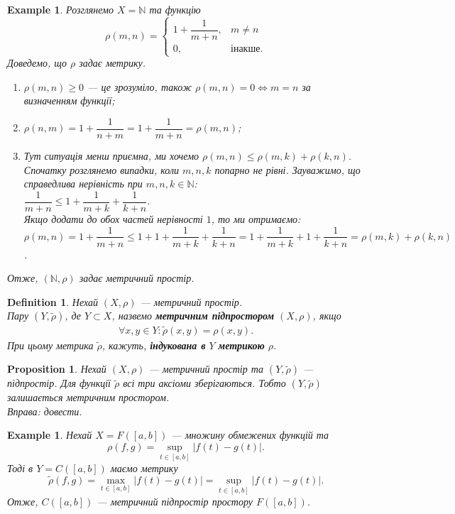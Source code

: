 \documentclass[a4paper, 10pt]{article}
\theoremstyle{theoremdd}
\theoremstyle{theoremdd}
\newtheorem{definition}[theorem]{Definition}
\theoremstyle{theoremdd}
\theoremstyle{theoremdd}
\newtheorem{example}[theorem]{Example}
\theoremstyle{theoremdd}
\newtheorem{proposition}[theorem]{Proposition}
\theoremstyle{theoremdd}
\theoremstyle{theoremdd}
\theoremstyle{theoremdd}
\begin{document}
\begin{example}
Розглянемо $X = \mathbb{N}$ та функцію
\[
\rho(m,n) = \begin{cases} 1 + \dfrac{1}{m+n}, & m \neq n \\ 0, & \text{інакше}. \end{cases}
\]
Доведемо, що $\rho$ задає метрику.
\begin{enumerate}[nosep,wide=0pt,label={\arabic*)}]
\item $\rho(m,n) \geq 0$ --- це зрозуміло, також $\rho(m,n) = 0 \iff m = n$ за визначенням функції;
\item $\rho(n,m) = 1 + \dfrac{1}{n+m} = 1 + \dfrac{1}{m+n} = \rho(m,n)$;
\item Тут ситуація менш приємна, ми хочемо $\rho(m,n) \leq \rho(m,k) + \rho(k,n)$. Спочатку розглянемо випадки, коли $m,n,k$ попарно не рівні. Зауважимо, що справедлива нерівність при $m,n,k \in \mathbb{N}$:\\
$\dfrac{1}{m+n} \leq 1 + \dfrac{1}{m+k} + \dfrac{1}{k+n}$.\\
Якщо додати до обох частей нерівності $1$, то ми отримаємо:\\
$\rho(m,n) = 1 + \dfrac{1}{m+n} \leq 1 + 1 + \dfrac{1}{m+k} + \dfrac{1}{k+n} = 1 + \dfrac{1}{m+k} + 1 + \dfrac{1}{k+n} = \rho(m,k) + \rho(k,n)$.
\end{enumerate}
Отже, $(\mathbb{N}, \rho)$ задає метричний простір.
\end{example}

\begin{definition}
Нехай $(X,\rho)$ --- метричний простір.\\
Пару $(Y,\tilde{\rho})$, де $Y \subset X$, назвемо \textbf{метричним підпростором} $(X,\rho)$, якщо
\begin{align*}
\forall x,y \in Y: \tilde{\rho}(x,y) = \rho(x,y).
\end{align*}
При цьому метрика $\tilde{\rho}$, кажуть, \textbf{індукована в} $Y$ \textbf{метрикою} $\rho$.
\end{definition}

\begin{proposition}
Нехай $(X,\rho)$ --- метричний простір та $(Y,\tilde{\rho})$ --- підпростір. Для функції $\tilde{\rho}$ всі три аксіоми зберігаються. Тобто $(Y,\tilde{\rho})$ залишається метричним простором.\\
\textit{Вправа: довести.}
\end{proposition}

\begin{example}
Нехай $X = F([a,b])$ --- множину обмежених функцій та 
\[
\rho(f,g) = \displaystyle \sup_{t \in [a,b]} |f(t)-g(t)|.
\]
Тоді в $Y = C([a,b])$ маємо метрику 
\[
\tilde{\rho}(f,g) = \displaystyle \max_{t \in [a,b]} |f(t)-g(t)| = \displaystyle \sup_{t \in [a,b]} |f(t)-g(t)|.
\]
 Отже, $C([a,b])$ --- метричний підпростір простору $F([a,b])$.
\end{example}
\end{document}
